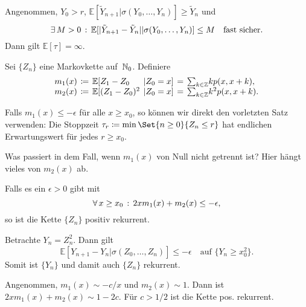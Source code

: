 \documentclass{cheat-sheet}
\newcommand{\E}{\mathbb{E}} %
\begin{document}
\begin{satz}
  Angenommen, $Y_0 > r$, $\E[ \tilde{Y}_{n+1} | \sigma(Y_0, \ldots, Y_n) ] \geq \tilde{Y}_n$ und
  \[
    \ex{M > 0}
    \E[ \abs{\tilde{Y}_{n+1} - \tilde{Y}_n} | \sigma(Y_0, \ldots, Y_n) ] \leq M
    \quad \text{fast sicher}.
  \]
  Dann gilt $\E[ \tau ] = \infty$.
\end{satz}



Sei $\{ Z_n \}$ eine Markovkette auf~$\mathbb{N}_0$.
Definiere
\[
  \arraycolsep=2pt
  \begin{array}{l l l l l l}
    m_1(x) &\coloneqq& \E[ Z_1 - Z_0 &| Z_0 = x ] &=& {\sum}_{k \in \Z} k p(x, x + k), \\
    m_2(x) &\coloneqq& \E[ (Z_1 - Z_0)^2 &| Z_0 = x ] &=& {\sum}_{k \in \Z} k^2 p(x, x + k).
  \end{array}
\]

\begin{bem}
  Falls $m_1(x) \leq - \epsilon$ für alle $x \geq x_0$, so können wir direkt den vorletzten Satz verwenden:
  Die Stoppzeit $\tau_r \coloneqq \min \Set{n \geq 0}{Z_n \leq r}$ hat endlichen Erwartungswert für jedes $r \geq x_0$.
\end{bem}

\begin{frage}
  Was passiert in dem Fall, wenn $m_1(x)$ von Null nicht getrennt ist? Hier hängt vieles von $m_2(x)$ ab.
\end{frage}

\begin{satz}
  Falls es ein $\epsilon > 0$ gibt mit
  \[
    \forall \, {x \geq x_0} \,:\, 2 x m_1(x) + m_2(x) \leq - \epsilon,
  \]
  so ist die Kette $\{ Z_n \}$ positiv rekurrent.
\end{satz}

\begin{beweisidee}
  Betrachte $Y_n = Z_n^2$.
  Dann gilt
  \[
    \E[ Y_{n+1} - Y_n | \sigma(Z_0, \ldots, Z_n) ] \leq - \epsilon
    \quad
    \text{auf } \{ Y_n \geq x_0^2 \}.
  \]
  Somit ist $\{ Y_n \}$ und damit auch $\{ Z_n \}$ rekurrent.
\end{beweisidee}

\begin{bsp}
  Angenommen, $m_1(x) \sim - c / x$ und $m_2(x) \sim 1$.
  Dann ist $2 x m_1(x) + m_2(x) \sim 1 - 2 c$.
  Für $c > 1/2$ ist die Kette pos. rekurrent.
\end{bsp}
\end{document}

